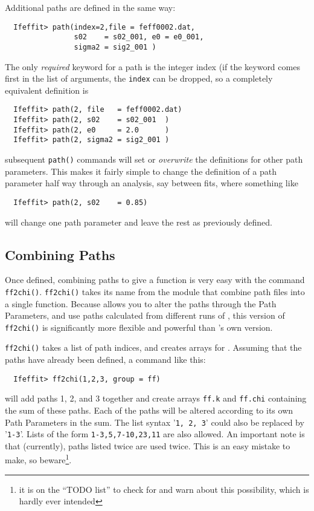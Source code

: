 \documentclass[11pt]{article}
\begin{document}
Additional paths are defined in the same way:
{\small\begin{verbatim}
  Ifeffit> path(index=2,file = feff0002.dat,
                s02    = s02_001, e0 = e0_001,
                sigma2 = sig2_001 )
\end{verbatim}}\noindent
The only {\emph{required}} keyword for a path is the integer index (if the
keyword comes first in the list of arguments, the {\tt{index}} can be
dropped, so a completely equivalent definition is
{\small\begin{verbatim}
  Ifeffit> path(2, file   = feff0002.dat)
  Ifeffit> path(2, s02    = s02_001  )
  Ifeffit> path(2, e0     = 2.0      )
  Ifeffit> path(2, sigma2 = sig2_001 )
\end{verbatim}}\noindent
subsequent {\tt{path()}} commands will set or {\emph{overwrite}} the
definitions for other path parameters.  This makes it fairly simple to
change the definition of a path parameter half way through an analysis, say
between fits, where something like
{\small\begin{verbatim}
  Ifeffit> path(2, s02    = 0.85)
\end{verbatim}}\noindent
will change one path parameter and leave the rest as previously defined.

\subsection{Combining Paths}\label{s:xafs-process:ff2chi}

Once defined, combining paths to give a {\chik} function is very easy with
the command {\tt{ff2chi()}}.  {\tt{ff2chi()}} takes its name from the {\feff}
module that combine {\feff} path files into a single {\chik} function.
Because {\ifeffit} allows you to alter the paths through the Path
Parameters, and use paths calculated from different runs of {\feff}, this
version of {\tt{ff2chi()}} is significantly more flexible and powerful than
{\feff}'s own version.

{\tt{ff2chi()}} takes a list of path indices, and creates arrays for
{\chik}.  Assuming that the paths have already been defined, a command
like this:
{\small\begin{verbatim}
  Ifeffit> ff2chi(1,2,3, group = ff)
\end{verbatim}}\noindent
\noindent
will add paths 1, 2, and 3 together and create arrays {\tt{ff.k}} and
{\tt{ff.chi}} containing the sum of these paths.  Each of the paths will be
altered according to its own Path Parameters in the sum.  The list syntax
'{\tt{1, 2, 3}}' could also be replaced by '{\tt{1-3}}'.  Lists of the form
{\tt{1-3,5,7-10,23,11}} are also allowed.  An important note is that
(currently), paths listed twice are used twice.  This is an easy mistake to
make, so beware{\footnote{it is on the ``TODO list'' to check for and warn
    about this possibility, which is hardly ever intended}}.
\end{document}
